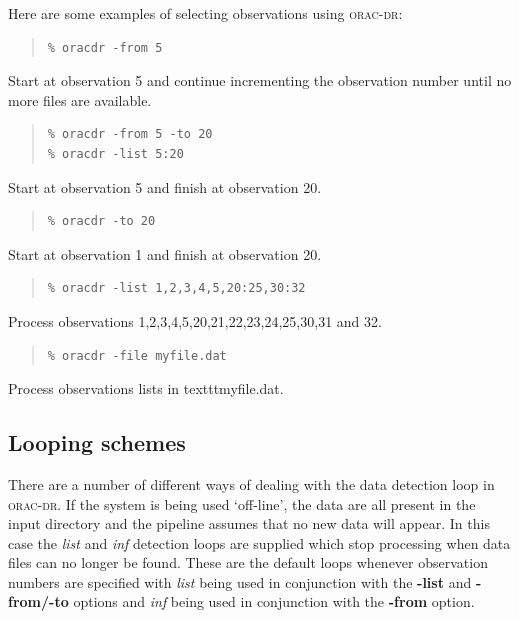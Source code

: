 \documentclass[twoside,11pt]{article}
\newcommand{\xref}[3]{#1}
\newcommand{\xlabel}[1]{}
\renewcommand{\_}{\texttt{\symbol{95}}}
\newcommand{\oracdr}{\xref{\textsc{orac-dr}}{sun230}{}}
\newenvironment{myquote}{\begin{quote}\begin{small}}{\end{small}\end{quote}}
\begin{document}
Here are some examples of selecting observations using \oracdr:

\begin{myquote}
\begin{verbatim}
% oracdr -from 5
\end{verbatim}
\end{myquote}
Start at observation 5 and continue incrementing the observation number
until no more files are available.
\begin{myquote}
\begin{verbatim}
% oracdr -from 5 -to 20
% oracdr -list 5:20
\end{verbatim}
\end{myquote}
Start at observation 5 and finish at observation 20.

\begin{myquote}
\begin{verbatim}
% oracdr -to 20
\end{verbatim}
\end{myquote}
Start at observation 1 and finish at observation 20.

\begin{myquote}
\begin{verbatim}
% oracdr -list 1,2,3,4,5,20:25,30:32
\end{verbatim}
\end{myquote}
Process observations 1,2,3,4,5,20,21,22,23,24,25,30,31 and 32.

\begin{myquote}
\begin{verbatim}
% oracdr -file myfile.dat
\end{verbatim}
\end{myquote}

Process observations lists in texttt{myfile.dat}.

\subsection{Looping schemes\xlabel{looping_schemes}}

There are a number of different ways of dealing with the data detection
loop in \oracdr. If the system is being used `off-line', the data are
all present in the input directory and the pipeline assumes that no new
data will appear. In this case the \textit{list} and \textit{inf} detection
loops are supplied which stop processing when data files can no longer 
be found. These are the default loops whenever observation 
numbers are specified with \textit{list} being used in conjunction with the
\textbf{-list} and \textbf{-from/-to} options and \textit{inf} being
used in conjunction with the \textbf{-from} option.
\end{document}
